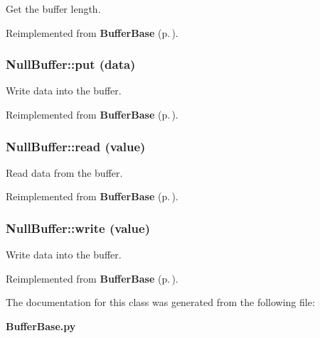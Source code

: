 Get the buffer length. 



Reimplemented from {\bf Buffer\-Base} {\rm (p.\,\pageref{classBufferBase_BufferBasea1})}.
\subsubsection{\setlength{\rightskip}{0pt plus 5cm}Null\-Buffer::put (data)}\label{classNullBuffer_NullBuffera9}


Write data into the buffer. 



Reimplemented from {\bf Buffer\-Base} {\rm (p.\,\pageref{classBufferBase_BufferBasea6})}.
\subsubsection{\setlength{\rightskip}{0pt plus 5cm}Null\-Buffer::read (value)}\label{classNullBuffer_NullBuffera5}


Read data from the buffer. 



Reimplemented from {\bf Buffer\-Base} {\rm (p.\,\pageref{classBufferBase_BufferBasea3})}.
\subsubsection{\setlength{\rightskip}{0pt plus 5cm}Null\-Buffer::write (value)}\label{classNullBuffer_NullBuffera4}


Write data into the buffer. 



Reimplemented from {\bf Buffer\-Base} {\rm (p.\,\pageref{classBufferBase_BufferBasea2})}.

The documentation for this class was generated from the following file:\begin{CompactItemize}
\item 
{\bf Buffer\-Base.py}\end{CompactItemize}
